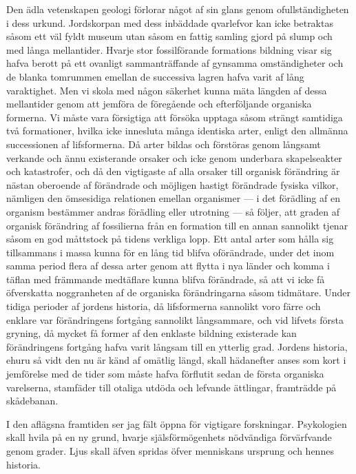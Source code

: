 Den ädla vetenskapen geologi förlorar något af sin glans genom ofullständigheten i dess urkund. Jordskorpan med dess inbäddade qvarlefvor kan icke betraktas såsom ett väl fyldt museum utan såsom en fattig samling gjord på slump och med långa mellantider. Hvarje stor fossilförande formations bildning visar sig hafva berott på ett ovanligt sammanträffande af gynsamma omständigheter och de blanka tomrummen emellan de successiva lagren hafva varit af lång varaktighet. Men vi skola med någon säkerhet kunna mäta längden af dessa mellantider genom att jemföra de föregående och efterföljande organiska formerna. Vi måste vara försigtiga att försöka upptaga såsom strängt samtidiga två formationer, hvilka icke innesluta många identiska arter, enligt den allmänna successionen af lifsformerna. Då arter bildas och förstöras genom långsamt verkande och ännu existerande orsaker och icke genom underbara skapelseakter och katastrofer, och då den vigtigaste af alla orsaker till organisk förändring är nästan oberoende af förändrade och möjligen hastigt förändrade fysiska vilkor, nämligen den ömsesidiga relationen emellan organismer — i det förädling af en organism bestämmer andras förädling eller utrotning — så följer, att graden af organisk förändring af fossilierna från en formation till en annan sannolikt tjenar såsom en god måttstock på tidens verkliga lopp. Ett antal arter som hålla sig tillsammans i massa kunna för en lång tid blifva oförändrade, under det inom samma period flera af dessa arter genom att flytta i nya länder och komma i täflan med främmande medtäflare kunna blifva förändrade, så att vi icke få öfverskatta noggranheten af de organiska förändringarna såsom tidmätare. Under tidiga perioder af jordens historia, då lifsformerna sannolikt voro färre och enklare var förändringens fortgång sannolikt långsammare, och vid lifvets första gryning, då mycket få former af den enklaste bildning existerade kan förändringens fortgång hafva varit långsam till en ytterlig grad. Jordens historia, ehuru så vidt den nu är känd af omätlig längd, skall hädanefter anses som kort i jemförelse med de tider som måste hafva förflutit sedan de första organiska varelserna, stamfäder till otaliga utdöda och lefvande ättlingar, framträdde på skådebanan.

I den aflägsna framtiden ser jag fält öppna för vigtigare forskningar. Psykologien skall hvila på en ny grund, hvarje själsförmögenhets nödvändiga förvärfvande genom grader. Ljus skall äfven spridas öfver menniskans ursprung och hennes historia.


